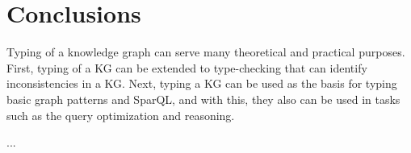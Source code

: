 \documentclass[runningheads]{llncs}
\begin{document}
\section{Conclusions}

Typing of a knowledge graph can serve many theoretical and practical
purposes. First, typing of a KG can be extended to type-checking that
can identify inconsistencies in a KG. Next, typing a KG can be used as
the basis for typing basic graph patterns and SparQL, and with this,
they also can be used in tasks such as the query optimization and
reasoning.

... \\





%



\end{document}
